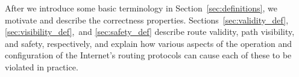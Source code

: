 After we introduce some basic terminology in
Section~\ref{sec:definitions}, we motivate and describe the correctness
properties.  Sections~\ref{sec:validity_def},
\ref{sec:visibility_def},~and
\ref{sec:safety_def} 
describe route validity, path visibility, and safety, respectively, and
explain how various aspects of the operation and configuration
of the Internet's routing protocols can cause each of these to be
violated in practice.   
